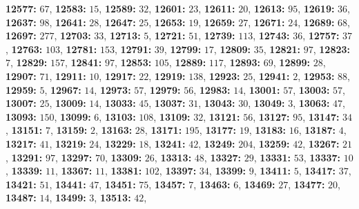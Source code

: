 \textsf{\bfseries 12577:} $67$, \textsf{\bfseries 12583:} $15$, \textsf{\bfseries 12589:} $32$, \textsf{\bfseries 12601:} $23$, \textsf{\bfseries 12611:} $20$, \textsf{\bfseries 12613:} $95$, \textsf{\bfseries 12619:} $36$, \textsf{\bfseries 12637:} $98$, \textsf{\bfseries 12641:} $28$, \textsf{\bfseries 12647:} $25$, \textsf{\bfseries 12653:} $19$, \textsf{\bfseries 12659:} $27$, \textsf{\bfseries 12671:} $24$, \textsf{\bfseries 12689:} $68$, \textsf{\bfseries 12697:} $277$, \textsf{\bfseries 12703:} $33$, \textsf{\bfseries 12713:} $5$, \textsf{\bfseries 12721:} $51$, \textsf{\bfseries 12739:} $113$, \textsf{\bfseries 12743:} $36$, \textsf{\bfseries 12757:} $37$, \textsf{\bfseries 12763:} $103$, \textsf{\bfseries 12781:} $153$, \textsf{\bfseries 12791:} $39$, \textsf{\bfseries 12799:} $17$, \textsf{\bfseries 12809:} $35$, \textsf{\bfseries 12821:} $97$, \textsf{\bfseries 12823:} $7$, \textsf{\bfseries 12829:} $157$, \textsf{\bfseries 12841:} $97$, \textsf{\bfseries 12853:} $105$, \textsf{\bfseries 12889:} $117$, \textsf{\bfseries 12893:} $69$, \textsf{\bfseries 12899:} $28$, \textsf{\bfseries 12907:} $71$, \textsf{\bfseries 12911:} $10$, \textsf{\bfseries 12917:} $22$, \textsf{\bfseries 12919:} $138$, \textsf{\bfseries 12923:} $25$, \textsf{\bfseries 12941:} $2$, \textsf{\bfseries 12953:} $88$, \textsf{\bfseries 12959:} $5$, \textsf{\bfseries 12967:} $14$, \textsf{\bfseries 12973:} $57$, \textsf{\bfseries 12979:} $56$, \textsf{\bfseries 12983:} $14$, \textsf{\bfseries 13001:} $57$, \textsf{\bfseries 13003:} $57$, \textsf{\bfseries 13007:} $25$, \textsf{\bfseries 13009:} $14$, \textsf{\bfseries 13033:} $45$, \textsf{\bfseries 13037:} $31$, \textsf{\bfseries 13043:} $30$, \textsf{\bfseries 13049:} $3$, \textsf{\bfseries 13063:} $47$, \textsf{\bfseries 13093:} $150$, \textsf{\bfseries 13099:} $6$, \textsf{\bfseries 13103:} $108$, \textsf{\bfseries 13109:} $32$, \textsf{\bfseries 13121:} $56$, \textsf{\bfseries 13127:} $95$, \textsf{\bfseries 13147:} $34$, \textsf{\bfseries 13151:} $7$, \textsf{\bfseries 13159:} $2$, \textsf{\bfseries 13163:} $28$, \textsf{\bfseries 13171:} $195$, \textsf{\bfseries 13177:} $19$, \textsf{\bfseries 13183:} $16$, \textsf{\bfseries 13187:} $4$, \textsf{\bfseries 13217:} $41$, \textsf{\bfseries 13219:} $24$, \textsf{\bfseries 13229:} $18$, \textsf{\bfseries 13241:} $42$, \textsf{\bfseries 13249:} $204$, \textsf{\bfseries 13259:} $42$, \textsf{\bfseries 13267:} $21$, \textsf{\bfseries 13291:} $97$, \textsf{\bfseries 13297:} $70$, \textsf{\bfseries 13309:} $26$, \textsf{\bfseries 13313:} $48$, \textsf{\bfseries 13327:} $29$, \textsf{\bfseries 13331:} $53$, \textsf{\bfseries 13337:} $10$, \textsf{\bfseries 13339:} $11$, \textsf{\bfseries 13367:} $11$, \textsf{\bfseries 13381:} $102$, \textsf{\bfseries 13397:} $34$, \textsf{\bfseries 13399:} $9$, \textsf{\bfseries 13411:} $5$, \textsf{\bfseries 13417:} $37$, \textsf{\bfseries 13421:} $51$, \textsf{\bfseries 13441:} $47$, \textsf{\bfseries 13451:} $75$, \textsf{\bfseries 13457:} $7$, \textsf{\bfseries 13463:} $6$, \textsf{\bfseries 13469:} $27$, \textsf{\bfseries 13477:} $20$, \textsf{\bfseries 13487:} $14$, \textsf{\bfseries 13499:} $3$, \textsf{\bfseries 13513:} $42$, 
